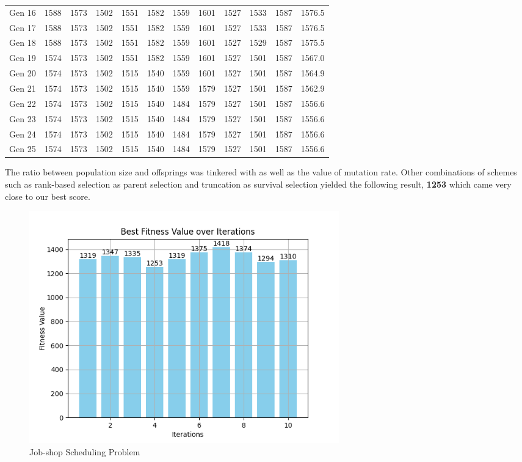 \documentclass[12pt]{article}
\begin{document}
\begin{table}[h]
\begin{adjustbox}{max width=0.97\textwidth}
\begin{tabular}{*{12}{c}}
            Gen 16 & 1588 & 1573 & 1502 & 1551 & 1582 & 1559 & 1601 & 1527 & 1533 & 1587 & 1576.5 \\
            Gen 17 & 1588 & 1573 & 1502 & 1551 & 1582 & 1559 & 1601 & 1527 & 1533 & 1587 & 1576.5 \\
            Gen 18 & 1588 & 1573 & 1502 & 1551 & 1582 & 1559 & 1601 & 1527 & 1529 & 1587 & 1575.5 \\
            Gen 19 & 1574 & 1573 & 1502 & 1551 & 1582 & 1559 & 1601 & 1527 & 1501 & 1587 & 1567.0 \\
            Gen 20 & 1574 & 1573 & 1502 & 1515 & 1540 & 1559 & 1601 & 1527 & 1501 & 1587 & 1564.9 \\
            Gen 21 & 1574 & 1573 & 1502 & 1515 & 1540 & 1559 & 1579 & 1527 & 1501 & 1587 & 1562.9 \\
            Gen 22 & 1574 & 1573 & 1502 & 1515 & 1540 & 1484 & 1579 & 1527 & 1501 & 1587 & 1556.6 \\
            Gen 23 & 1574 & 1573 & 1502 & 1515 & 1540 & 1484 & 1579 & 1527 & 1501 & 1587 & 1556.6 \\
            Gen 24 & 1574 & 1573 & 1502 & 1515 & 1540 & 1484 & 1579 & 1527 & 1501 & 1587 & 1556.6 \\
            Gen 25 & 1574 & 1573 & 1502 & 1515 & 1540 & 1484 & 1579 & 1527 & 1501 & 1587 & 1556.6 \\
            \bottomrule
        \end{tabular}
    \end{adjustbox}
\end{table}


\newpage

The ratio between population size and offsprings was tinkered with as well as the value of mutation rate. 
Other combinations of schemes such as rank-based selection as parent selection and truncation as survival selection yielded the following result, \textbf{1253} which came very close to our best score. 

\begin{figure}[h]
    \centering
    \includegraphics[width=0.65\textwidth]{images/JSSP_rbstr150-40-2000-0.5-10.png}
    \caption{Job-shop Scheduling Problem}
\end{figure}
\end{document}
